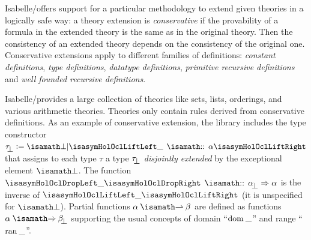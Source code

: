 Isabelle/\HOL offers support for a particular methodology to extend
given theories in a logically safe way: a theory extension is
\emph{conservative} if the provability of a formula in the extended
theory is the same as in the original theory. Then the consistency of
an extended theory depends on the consistency of the original
one. Conservative extensions apply to different families of
definitions: \emph{constant definitions}, \emph{type definitions},
\emph{datatype definitions}, \emph{primitive recursive definitions}
and \emph{well founded recursive definitions}.

Isabelle/\HOL provides a large collection of theories like sets,
lists, orderings, and various arithmetic theories. Theories only
contain rules derived from conservative definitions. As an example of
conservative extension, the library includes the type
constructor $\up{\tau} \defeq \isasymbottom | \lift{\_ \ap\ofType\ap
  \alpha}$ that assigns to each type $\tau$ a type $\up{\tau}$
\emph{disjointly extended} by the exceptional element
$\isasymbottom$. The function $\drop{\_} \ap\ofType\ap \up{\alpha} \to
\alpha$ is the inverse of $\lift{\_}$ (it is unspecified for
$\isasymbottom$). Partial functions $\alpha \ap \isasymrightharpoonup
\ap \beta$ are defined as functions $\alpha \ap \isasymRightarrow \ap
\up{\beta}$ supporting the usual concepts of domain ``$\mathrm{dom}\:\_$''
and range ``$\mathrm{ran}\:\_$''.


